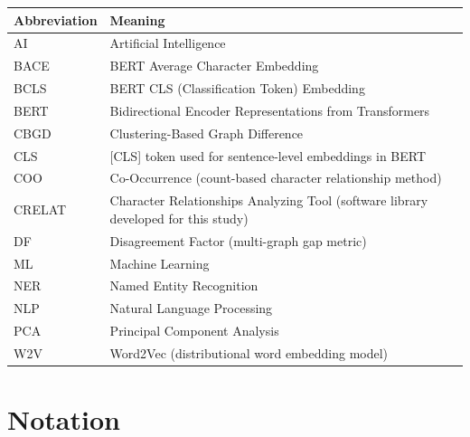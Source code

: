 \documentclass[a4paper,12pt]{report}
\begin{document}
\begin{table}[h!]
\centering
\renewcommand{\arraystretch}{1.3}
\begin{tabular}{@{}ll@{}}
\toprule
\textbf{Abbreviation} & \textbf{Meaning} \\ 
\midrule
AI & Artificial Intelligence \\
BACE & BERT Average Character Embedding \\
BCLS & BERT CLS (Classification Token) Embedding \\
BERT & Bidirectional Encoder Representations from Transformers \\
CBGD & Clustering-Based Graph Difference \\
CLS & [CLS] token used for sentence-level embeddings in BERT \\
COO & Co-Occurrence (count-based character relationship method) \\
CRELAT & Character Relationships Analyzing Tool (software library developed for this study) \\
DF & Disagreement Factor (multi-graph gap metric) \\
ML & Machine Learning \\
NER & Named Entity Recognition \\
NLP & Natural Language Processing \\
PCA & Principal Component Analysis \\
W2V & Word2Vec (distributional word embedding model) \\
\bottomrule
\end{tabular}
\end{table}
 
\newpage
{}

\chapter*{Notation}
\end{document}
